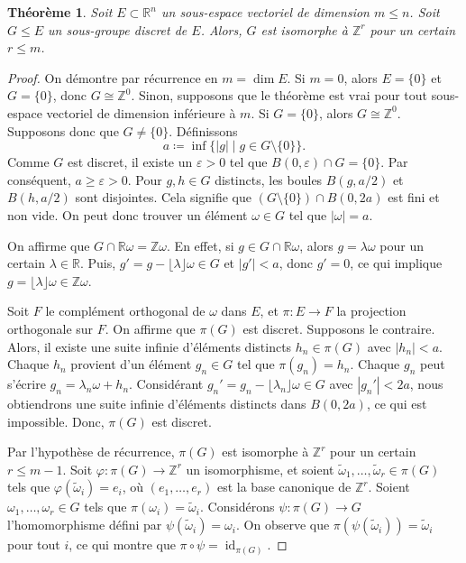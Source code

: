\documentclass{article}
\newcommand{\R}{\mathbb{R}}
\newcommand{\Z}{\mathbb{Z}}
\newtheorem*{thm}{Théorème}
\begin{document}
\begin{thm}
    Soit \( E \subset \R^n \) un sous-espace vectoriel de dimension \( m \leq n \). Soit \( G \leq E \) un sous-groupe discret de \( E \). Alors, \( G \) est isomorphe à \( \Z^r \) pour un certain \( r \leq m \).
\end{thm}

\begin{proof}
    On démontre par récurrence en $m = \dim E$. Si $m = 0$, alors $E = \{0\}$ et $G = \{0\}$, donc $G \cong \Z^0$. Sinon, supposons que le théorème est vrai pour tout sous-espace vectoriel de dimension inférieure à $m$. Si $G = \{0\}$, alors $G \cong \Z^0$. Supposons donc que $G \neq \{0\}$. Définissons
    \[
    a \coloneq \inf \{ |g| \mid g \in G \setminus \{0\} \}.
    \]
    Comme $G$ est discret, il existe un $\varepsilon > 0$ tel que $B(0, \varepsilon) \cap G = \{0\}$. Par conséquent, $a \geq \varepsilon > 0$. Pour $g, h \in G$ distincts, les boules $B(g, a/2)$ et $B(h, a/2)$ sont disjointes. Cela signifie que $(G \setminus \{0\}) \cap B(0, 2a)$ est fini et non vide. On peut donc trouver un élément $\omega \in G$ tel que $|\omega| = a$.
    
    On affirme que $G \cap \R \omega = \Z \omega$. En effet, si $g \in G \cap \R \omega$, alors $g = \lambda \omega$ pour un certain $\lambda \in \R$. Puis, $g' = g - \lfloor \lambda \rfloor \omega \in G$ et $|g'| < a$, donc $g' = 0$, ce qui implique $g = \lfloor \lambda \rfloor \omega \in \Z \omega$.

    Soit $F$ le complément orthogonal de $\omega$ dans $E$, et $\pi \colon E \to F$ la projection orthogonale sur $F$. On affirme que $\pi(G)$ est discret. Supposons le contraire. Alors, il existe une suite infinie d'éléments distincts $h_n \in \pi(G)$ avec $|h_n| < a$. Chaque $h_n$ provient d'un élément $g_n \in G$ tel que $\pi(g_n) = h_n$. Chaque $g_n$ peut s'écrire $g_n = \lambda_n \omega + h_n$. Considérant $g_n' = g_n - \lfloor \lambda_n \rfloor \omega \in G$ avec $|g_n'| < 2a$, nous obtiendrons une suite infinie d'éléments distincts dans $B(0, 2a)$, ce qui est impossible. Donc, $\pi(G)$ est discret.

    Par l'hypothèse de récurrence, $\pi(G)$ est isomorphe à $\Z^r$ pour un certain $r \leq m - 1$. Soit $\varphi \colon \pi(G) \to \Z^r$ un isomorphisme, et soient $\tilde \omega_1, \ldots, \tilde \omega_r \in \pi(G)$ tels que $\varphi(\tilde \omega_i) = e_i$, où $(e_1, \ldots, e_r)$ est la base canonique de $\Z^r$. Soient $\omega_1, \ldots, \omega_r \in G$ tels que $\pi(\omega_i) = \tilde \omega_i$. Considérons $\psi \colon \pi(G) \to G$ l'homomorphisme défini par $\psi(\tilde \omega_i) = \omega_i$. On observe que $\pi(\psi(\tilde \omega_i)) = \tilde \omega_i$ pour tout $i$, ce qui montre que $\pi \circ \psi = \operatorname{id}_{\pi(G)}$.


\end{proof}
\end{document}
